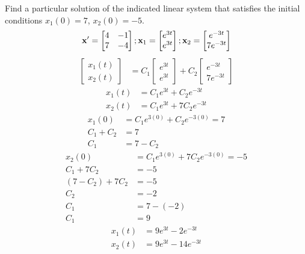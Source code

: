 \documentclass{article}
\begin{document}
Find a particular solution of the indicated linear system that satisfies the initial conditions $ x_1(0) = 7 $, $ x_2(0) = -5 $.
\begin{equation*}
	\vect{x}' = \begin{bmatrix}
		4 & -1 \\
		7 & -4
	\end{bmatrix};
	\vect{x}_1 = \begin{bmatrix}
		e^{3t} \\
		e^{3t}
	\end{bmatrix};
	\vect{x}_2 = \begin{bmatrix}
		e^{-3t} \\
		7e^{-3t}
	\end{bmatrix}
\end{equation*}
\begin{align*}
	\begin{bmatrix} x_1(t) \\ x_2(t) \end{bmatrix}
	& = C_1 \begin{bmatrix} e^{3t} \\ e^{3t} \end{bmatrix}
	+ C_2 \begin{bmatrix} e^{-3t} \\ 7e^{-3t} \end{bmatrix}
\end{align*}
\begin{align*}
	x_1(t) & = C_1e^{3t} + C_2e^{-3t} \\
	x_2(t) & = C_1e^{3t} + 7C_2e^{-3t}
\end{align*}
\begin{align*}
	x_1(0) & = C_1e^{3(0)} + C_2e^{-3(0)} = 7 \\
	C_1 + C_2 & = 7 \\
	C_1 & = 7 - C_2
\end{align*}
\begin{align*}
	x_2(0) & = C_1e^{3(0)} + 7C_2e^{-3(0)} = -5 \\
	C_1 + 7C_2 & = -5 \\
	(7 - C_2) + 7C_2 & = -5 \\
	C_2 & = -2 \\
	C_1 & = 7 - (-2) \\
	C_1 & = 9
\end{align*}
\begin{align*}
	x_1(t) & = 9e^{3t} - 2e^{-3t} \\
	x_2(t) & = 9e^{3t} - 14e^{-3t}
\end{align*}
\end{document}
